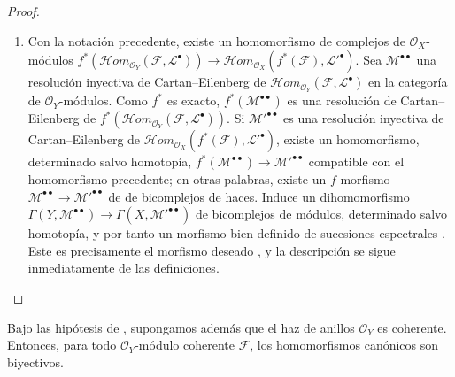 \begin{proof}
\begin{enumerate}
  \item[\rm(ii)]
  Con la notación precedente, existe un homomorfismo de complejos de
  $\mathcal O_X$-módulos
  $f^*(\mathcal{H}om_{\mathcal O_Y}(\mathcal F,\mathcal L^\bullet))\longrightarrow\mathcal{H}om_{\mathcal O_X}(f^*(\mathcal F),\mathcal L'^\bullet)$.
  Sea $\mathcal M^{\bullet\bullet}$ una resolución inyectiva de
  Cartan--Eilenberg de
  $\mathcal{H}om_{\mathcal O_Y}(\mathcal F,\mathcal L^\bullet)$ en la categoría de
  $\mathcal O_Y$-módulos.  Como $f^*$ es exacto,
  $f^*(\mathcal M^{\bullet\bullet})$ es una resolución de Cartan--Eilenberg de
  $f^*(\mathcal{H}om_{\mathcal O_Y}(\mathcal F,\mathcal L^\bullet))$.
  Si $\mathcal M'^{\bullet\bullet}$ es una resolución inyectiva de
  Cartan--Eilenberg de
  $\mathcal{H}om_{\mathcal O_X}(f^*(\mathcal F),\mathcal L'^\bullet)$, existe
   un homomorfismo, determinado salvo homotopía,
  $f^*(\mathcal M^{\bullet\bullet})\longrightarrow\mathcal M'^{\bullet\bullet}$
  compatible con el homomorfismo precedente; en otras palabras, existe
  un $f$-morfismo
  $\mathcal M^{\bullet\bullet}\to
\mathcal M'^{\bullet\bullet}$ de
  de bicomplejos de haces.
  Induce un dihomomorfismo
  $\Gamma(Y,\mathcal M^{\bullet\bullet})\to
\Gamma(X,\mathcal M'^{\bullet\bullet})$
  de bicomplejos de módulos, determinado salvo homotopía, y por tanto
  un morfismo bien definido de sucesiones espectrales
  .  Este es precisamente el morfismo deseado
  , y la descripción
   se sigue inmediatamente de las definiciones.
\end{enumerate}
\end{proof}

\begin{proposition}[12.3.5]
\label{0.12.3.5}
\label{0.12.3.5-fr}
Bajo las hipótesis de , supongamos además que el
haz de anillos $\mathcal O_Y$ es coherente.
Entonces, para todo $\mathcal O_Y$-módulo coherente $\mathcal F$, los
homomorfismos canónicos  son biyectivos.
\end{proposition}

